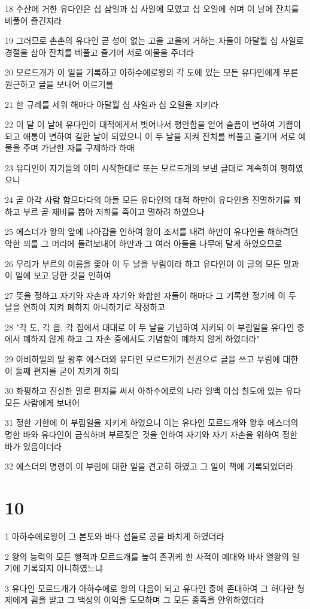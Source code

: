 \par 18 수산에 거한 유다인은 십 삼일과 십 사일에 모였고 십 오일에 쉬며 이 날에 잔치를 베풀어 즐긴지라
\par 19 그러므로 촌촌의 유다인 곧 성이 없는 고을 고을에 거하는 자들이 아달월 십 사일로 경절을 삼아 잔치를 베풀고 즐기며 서로 예물을 주더라
\par 20 모르드개가 이 일을 기록하고 아하수에로왕의 각 도에 있는 모든 유다인에게 무론 원근하고 글을 보내어 이르기를
\par 21 한 규례를 세워 해마다 아달월 십 사일과 십 오일을 지키라
\par 22 이 달 이 날에 유다인이 대적에게서 벗어나서 평안함을 얻어 슬픔이 변하여 기쁨이 되고 애통이 변하여 길한 날이 되었으니 이 두 날을 지켜 잔치를 베풀고 즐기며 서로 예물을 주며 가난한 자를 구제하라 하매
\par 23 유다인이 자기들의 이미 시작한대로 또는 모르드개의 보낸 글대로 계속하여 행하였으니
\par 24 곧 아각 사람 함므다다의 아들 모든 유다인의 대적 하만이 유다인을 진멸하기를 꾀하고 부르 곧 제비를 뽑아 저희를 죽이고 멸하려 하였으나
\par 25 에스더가 왕의 앞에 나아감을 인하여 왕이 조서를 내려 하만이 유다인을 해하려던 악한 꾀를 그 머리에 돌려보내어 하만과 그 여러 아들을 나무에 달게 하였으므로
\par 26 무리가 부르의 이름을 좇아 이 두 날을 부림이라 하고 유다인이 이 글의 모든 말과 이 일에 보고 당한 것을 인하여
\par 27 뜻을 정하고 자기와 자손과 자기와 화합한 자들이 해마다 그 기록한 정기에 이 두 날을 연하여 지켜 폐하지 아니하기로 작정하고
\par 28 "각 도, 각 읍, 각 집에서 대대로 이 두 날을 기념하여 지키되 이 부림일을 유다인 중에서 폐하지 않게 하고 그 자손 중에서도 기념함이 폐하지 않게 하였더라"
\par 29 아비하일의 딸 왕후 에스더와 유다인 모르드개가 전권으로 글을 쓰고 부림에 대한 이 둘째 편지를 굳이 지키게 하되
\par 30 화평하고 진실한 말로 편지를 써서 아하수에로의 나라 일백 이십 칠도에 있는 유다 모든 사람에게 보내어
\par 31 정한 기한에 이 부림일을 지키게 하였으니 이는 유다인 모르드개와 왕후 에스더의 명한 바와 유다인이 금식하며 부르짖은 것을 인하여 자기와 자기 자손을 위하여 정한 바가 있음이더라
\par 32 에스더의 명령이 이 부림에 대한 일을 견고히 하였고 그 일이 책에 기록되었더라

\chapter{10}

\par 1 아하수에로왕이 그 본토와 바다 섬들로 공을 바치게 하였더라
\par 2 왕의 능력의 모든 행적과 모르드개를 높여 존귀케 한 사적이 메대와 바사 열왕의 일기에 기록되지 아니하였느냐
\par 3 유다인 모르드개가 아하수에로 왕의 다음이 되고 유다인 중에 존대하여 그 허다한 형제에게 굄을 받고 그 백성의 이익을 도모하며 그 모든 종족을 안위하였더라


